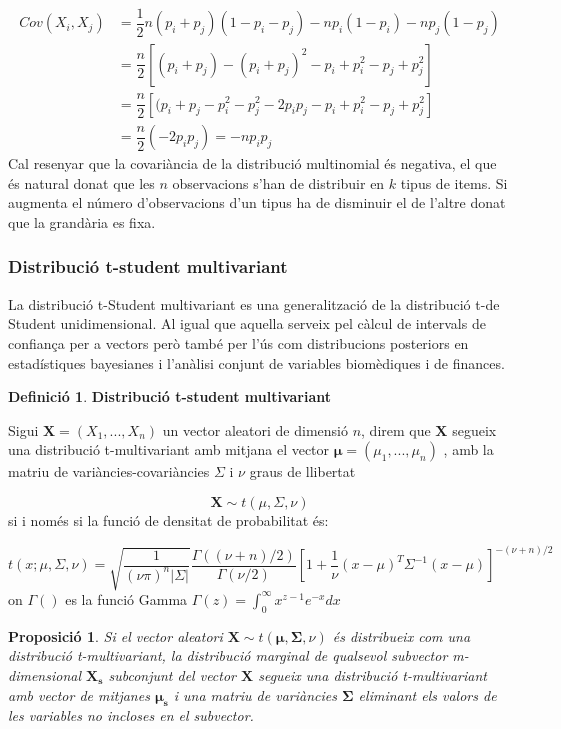 \documentclass[
  catalan,
]{article}
\newtheorem{proposition}{Proposició}[section]
\theoremstyle{definition}
\newtheorem{definition}{Definició}[section]
\theoremstyle{definition}
\theoremstyle{definition}
\theoremstyle{definition}
\theoremstyle{remark}
\begin{document}
\[
\begin{aligned}
Cov(X_i,X_j) &= \dfrac{1}{2}  n(p_i+p_j)(1-p_i-p_j)-np_i(1-p_i)- np_j(1-p_j) \\
& =\dfrac{n}{2} \left[ (p_i+p_j) - (p_i+p_j)^2-p_i+p_i^2-p_j+p_j^2 \right] \\
& =\dfrac{n}{2} \left[ (p_i+p_j - p_i^2-p_j^2- 2p_ip_j -p_i+p_i^2-p_j+p_j^2 \right] \\
&= \dfrac{n}{2}  (-2p_ip_j)  =-n p_i p_j 
\end{aligned}
\]
Cal resenyar que la covariància de la distribució multinomial és negativa, el que és natural donat que les \(n\) observacions s'han de distribuir en \(k\) tipus de items. Si augmenta el número d'observacions d'un tipus ha de disminuir el de l'altre donat que la grandària es fixa.

\subsubsection{Distribució t-student multivariant}\label{distribuciuxf3-t-student-multivariant}

La distribució t-Student multivariant es una generalització de la distribució t-de Student unidimensional. Al igual que aquella serveix pel càlcul de intervals de confiança per a vectors però també per l'ús com distribucions posteriors en estadístiques bayesianes i l'anàlisi conjunt de variables biomèdiques i de finances.

\begin{definition}
\textbf{Distribució t-student multivariant}

Sigui \(\mathbf{X}=(X_1,...,X_n)\) un vector aleatori de dimensió \(n\), direm que \(\mathbf{X}\) segueix una distribució t-multivariant amb mitjana el vector \(\boldsymbol{\mu}=(\mu_1,...,\mu_n)\) , amb la matriu de variàncies-covariàncies \(\Sigma\) i \(\nu\) graus de llibertat

\[
  \mathbf{X} \sim t(\mu,\Sigma,\nu)
\]
si i només si la funció de densitat de probabilitat és:

\[
t(x;\mu,\Sigma,\nu)=\sqrt{\dfrac {1}{(\nu\pi)^n |\Sigma|}} \dfrac {\Gamma((\nu+n)/2)}{\Gamma(\nu/2)} \left[ 1+\dfrac {1}{\nu} (x-\mu)^T \Sigma^{-1} (x-\mu)  \right]^{-(\nu+n)/2}   \label{eq:fxymultit}
\]
on \(\Gamma ()\) es la funció Gamma \(\Gamma(z)= \int_0^{\infty} x^{z-1} e^{-x}dx\)
\end{definition}

\begin{proposition}
\protect\hypertarget{prp:marginalt}{}\label{prp:marginalt}Si el vector aleatori \(\mathbf{X} \sim t(\boldsymbol{\mu},\boldsymbol{\Sigma},\nu)\) és distribueix com una distribució t-multivariant, la distribució marginal de qualsevol subvector m-dimensional \(\mathbf{X_s}\) subconjunt del vector \(\mathbf{X}\) segueix una distribució t-multivariant amb vector de mitjanes \(\boldsymbol{\mu_s}\) i una matriu de variàncies \(\boldsymbol{\Sigma}\) eliminant els valors de les variables no incloses en el subvector.
\end{proposition}
\end{document}
